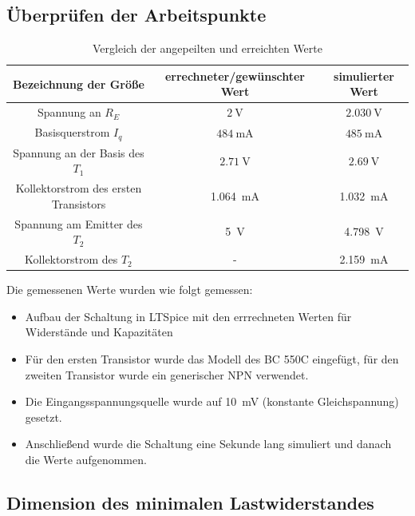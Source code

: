 \subsection{Überprüfen der Arbeitspunkte}

\begin{table}[H]
    \centering
    \begin{tabular}{|c|c|c|}
    \hline
         Bezeichnung der Größe & errechneter/gewünschter Wert & simulierter Wert \\ \hline \hline
         Spannung an $R_E$ & $\SI{2}{\volt}$ & $\SI{2.030}{\volt}$ \\ \hline
         Basisquerstrom $I_q$ & $\SI{484}{\milli \ampere}$ & $\SI{485}{\milli \ampere}$ \\ \hline
         Spannung an der Basis des $T_1$ & $\SI{2.71}{\volt}$ & $\SI{2.69}{\volt}$ \\ \hline
         Kollektorstrom des ersten Transistors& \SI{1.064}{\milli \ampere} & \SI{1.032}{\milli \ampere} \\ \hline
         Spannung am Emitter des $T_2$ & \SI{5}{\volt} & \SI{4.798}{\volt} \\ \hline
         Kollektorstrom des $T_2$ & - & \SI{2.159}{\milli \ampere} \\ \hline
    \end{tabular}
    \caption{Vergleich der angepeilten und erreichten Werte}
    \label{tab:my_label}
\end{table}

Die gemessenen Werte wurden wie folgt gemessen:
\begin{itemize}
    \item Aufbau der Schaltung in LTSpice mit den errrechneten Werten für Widerstände und Kapazitäten
    \item Für den ersten Transistor wurde das Modell des BC 550C eingefügt, für den zweiten Transistor wurde ein generischer NPN verwendet.
    \item Die Eingangsspannungsquelle wurde auf \SI{10}{\milli \volt} (konstante Gleichspannung) gesetzt.
    \item Anschließend wurde die Schaltung eine Sekunde lang simuliert und danach die Werte aufgenommen.
\end{itemize}

\subsection{Dimension des minimalen Lastwiderstandes}


